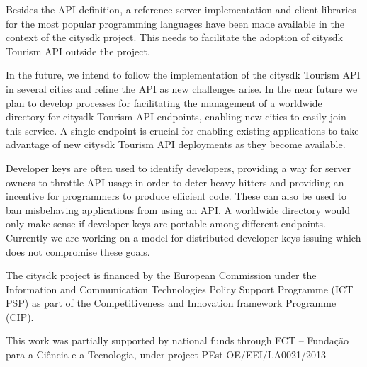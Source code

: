 \documentclass[times,doublespace]{ettauth}%
\begin{document}
Besides the API definition, a reference server implementation and client libraries for the most popular programming languages have been made available in the context of the \ac{citysdk} project.
This needs to facilitate the adoption of \ac{citysdk} Tourism API outside the project.

In the future, we intend to follow the implementation of the \ac{citysdk} Tourism API in several cities and refine the API as new challenges arise.
In the near future we plan to develop processes for facilitating the management of a worldwide directory for \ac{citysdk} Tourism API endpoints, enabling new cities to easily join this service.
A single endpoint is crucial for enabling existing applications to take advantage of new \ac{citysdk} Tourism API deployments as they become available.

Developer keys are often used to identify developers, providing a way for server owners to throttle API usage in order to deter heavy-hitters and providing an incentive for programmers to produce efficient code.
These can also be used to ban misbehaving applications from using an API\@.
A worldwide directory would only make sense if developer keys are portable among different endpoints.
Currently we are working on a model for distributed developer keys issuing which does not compromise these goals.


\acks
The \ac{citysdk} project is financed by the European Commission under the Information and Communication Technologies Policy Support Programme (ICT PSP) as part of the Competitiveness and Innovation framework Programme (CIP).

This work was partially supported by national funds through FCT – Funda\c c\~ao para a Ci\^encia e a Tecnologia, under project PEst-OE/EEI/LA0021/2013



\end{document}
